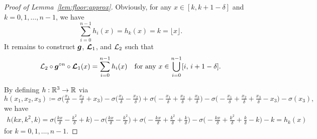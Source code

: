 \documentclass[nohyperref]{article}
\theoremstyle{plain}
\theoremstyle{definition}
\theoremstyle{remark}
\begin{document}
\begin{proof}[Proof of Lemma~\ref{lem:floor:approx}]
Obviously, for any $x\in [k,k+1-\delta]$ and $k=0,1,\dotsc,n-1$, we have
\begin{equation*}
	\sum_{i=0}^{n-1}h_i(x)= h_k(x)=k=\lfloor x\rfloor.
\end{equation*}
It remains to construct ${\bm{g}}$, ${\bm{\mathcal{L}}}_1$, and ${\mathcal{L}}_2$ such that
\begin{equation*}
	{\mathcal{L}}_2\circ {\bm{g}}^{\circ n}\circ {\bm{\mathcal{L}}}_1(x) =\sum_{i=0}^{n-1}h_i(x)\quad \textnormal{for any $x\in \bigcup_{i=0}^{n-1}[i,\, i+1-\delta]$}.
\end{equation*}

By defining $h:\R^3 \to \R$ via 
\begin{equation*}
	h(x_1,x_2,x_3)\coloneqq \sigma\big(\tfrac{x_1}{\delta}-\tfrac{x_2}{\delta}+x_3\big)
	-\sigma\big(\tfrac{x_1}{\delta}-\tfrac{x_2}{\delta}\big)
	+\sigma\big(-\tfrac{x_1}{\delta}+\tfrac{x_2}{\delta}+\tfrac{x_3}{\delta}\big)
	-\sigma\big(-\tfrac{x_1}{\delta}+\tfrac{x_2}{\delta}+\tfrac{x_3}{\delta}-x_3\big)-\sigma(x_3),
\end{equation*}
we have
\begin{equation}
	\label{eq:h:to:hk}
	\begin{split}
		h\big(kx,k^2,k\big)=
		\sigma\big(\tfrac{kx}{\delta}-\tfrac{k^2}{\delta}+ k\big)
		-
		\sigma\big(\tfrac{kx}{\delta}-\tfrac{k^2}{\delta}\big)
		+\sigma\big(-\tfrac{kx}{\delta}+\tfrac{k^2}{\delta}+ \tfrac{k}{\delta}\big)
		-\sigma\big(-\tfrac{kx}{\delta}+\tfrac{k^2}{\delta}+ \tfrac{k}{\delta}-k\big)-k=h_k(x)
	\end{split}
\end{equation}
for $k=0,1,\dotsc,n-1$.


\end{proof}
\end{document}
